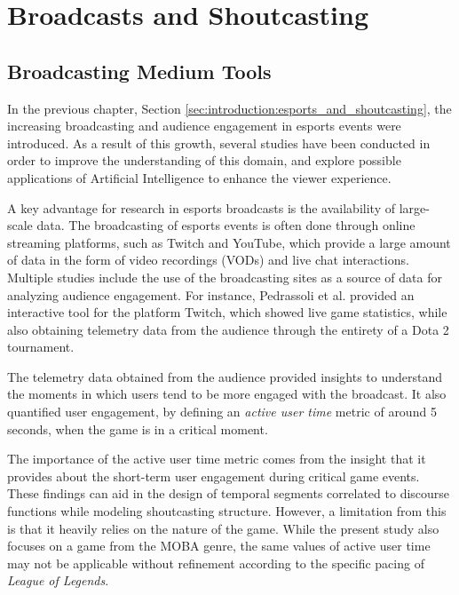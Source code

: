 \section{Broadcasts and Shoutcasting}
\label{sec:literature-review:broadcast-and-shoutcasting}

\subsection{Broadcasting Medium Tools}
\label{subsec:broadcast-medium-tools}

In the previous chapter, Section \ref{sec:introduction:esports_and_shoutcasting}, the increasing broadcasting and audience engagement in esports events were introduced. As a result of this growth, several studies have been conducted in order to improve the understanding of this domain, and explore possible applications of Artificial Intelligence to enhance the viewer experience. 

\medskip

A key advantage for research in esports broadcasts is the availability of large-scale data. The broadcasting of esports events is often done through online streaming platforms, such as Twitch and YouTube, which provide a large amount of data in the form of video recordings (VODs) and live chat interactions. Multiple studies include the use of the broadcasting sites as a source of data for analyzing audience engagement. For instance, Pedrassoli et al. \cite{pedrassoli2024passive} provided an interactive tool for the platform Twitch, which showed live game statistics, while also obtaining telemetry data from the audience through the entirety of a Dota 2 tournament.

\medskip

The telemetry data obtained from the audience provided insights to understand the moments in which users tend to be more engaged with the broadcast. It also quantified user engagement, by defining an \textit{active user time} metric of around 5 seconds, when the game is in a critical moment.

\medskip

The importance of the active user time metric comes from the insight that it provides about the short-term user engagement during critical game events. These findings can aid in the design of temporal segments correlated to discourse functions while modeling shoutcasting structure. However, a limitation from this is that it heavily relies on the nature of the game. While the present study also focuses on a game from the MOBA genre, the same values of active user time may not be applicable without refinement according to the specific pacing of \textit{League of Legends}.

